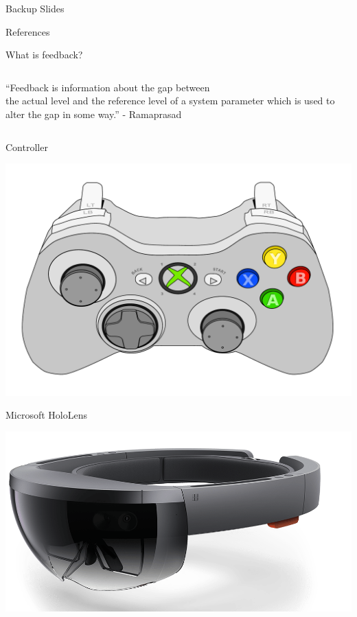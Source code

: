\documentclass[10pt]{beamer}
\begin{document}
\begin{frame}[standout]
  Backup Slides
\end{frame}

\appendix

\begin{frame}[allowframebreaks]{References}
  
  
\end{frame}

\begin{frame}[fragile]{What is feedback?}
  \begin{columns}[T]
    \begin{column}{.8\textwidth}
      \begin{block}{}
        ``Feedback is information about the gap between\\ the actual level and the reference level of a system parameter which is used to alter the gap in some way.'' - Ramaprasad~\cite{Ramaprasad1983}
      \end{block}
    \end{column}
  \end{columns}
\end{frame}

\begin{frame}[fragile]{Controller}
  \begin{center}
    \includegraphics[width=0.75\linewidth]{../img/Xbox_Controller.pdf}
  \end{center}
\end{frame}

\begin{frame}[fragile]{Microsoft HoloLens}
  \begin{center}
    \includegraphics[width=\textwidth]{../img/Hololens.png}
  \end{center}
\end{frame}
\end{document}
